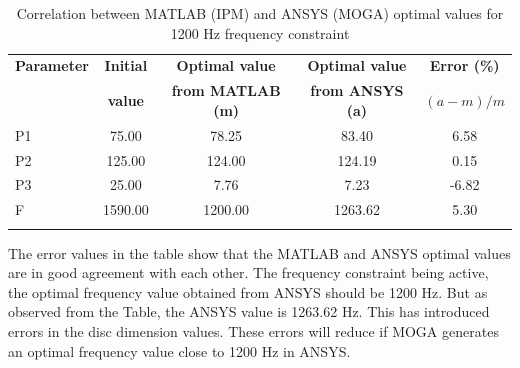 \documentclass[12pt]{article}
\begin{document}
\begin{longtable}{|l|c|c|c|c|}
\hline 
\textbf{Parameter} & \textbf{Initial} & \textbf{Optimal value} & \textbf{Optimal value} & \textbf{Error (\%)} \\
 & \textbf{value} & \textbf{from MATLAB (m)} & \textbf{from ANSYS (a)} & \textbf{$(a-m)/m$}\\
\hline
P1 & 75.00 & 78.25 & 83.40 & 6.58 \\
\hline
P2 & 125.00 & 124.00 & 124.19 & 0.15 \\
\hline
P3 & 25.00 & 7.76 & 7.23 & -6.82\\
\hline
F & 1590.00 & 1200.00 & 1263.62 & 5.30 \\
\hline
\caption{Correlation between MATLAB (IPM) and ANSYS (MOGA) optimal values for 1200 Hz frequency constraint}
\label{corr2}
\end{longtable}
The error values in the table show that the MATLAB and ANSYS optimal values are in good agreement with each other. The frequency constraint being active, the optimal frequency value obtained from ANSYS should be 1200 Hz. But as observed from the Table, the ANSYS value is 1263.62 Hz. This has introduced errors in the disc dimension values. These errors will reduce if MOGA generates an optimal frequency value close to 1200 Hz in ANSYS.
\end{document}
